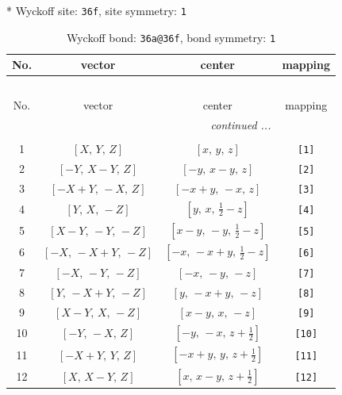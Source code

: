 \documentclass[fleqn,8pt]{jsarticle}
\begin{document}
* Wyckoff site: {\tt 36f}, site symmetry: {\tt 1}
\renewcommand{\arraystretch}{1.2}
\begin{longtable}{cccc}
\caption{Wyckoff bond: {\tt 36a@36f}, bond symmetry: {\tt 1}}
 \\
 \hline \hline
No. & vector & center & mapping \\ \hline \endfirsthead

\multicolumn{3}{l}{\tablename\ \thetable{}} \\
 \hline \hline
No. & vector & center & mapping \\ \hline \endhead

 \hline \hline
\multicolumn{3}{r}{\footnotesize\it continued ...} \\ \endfoot

 \hline \hline
\multicolumn{3}{r}{} \\ \endlastfoot

1 & $\left[ X,\, Y,\, Z \right]$ & $\left[ x,\, y,\, z \right]$ & {\tt [1]} \\ \hline
2 & $\left[ - Y,\, X - Y,\, Z \right]$ & $\left[ - y,\, x - y,\, z \right]$ & {\tt [2]} \\ \hline
3 & $\left[ - X + Y,\, - X,\, Z \right]$ & $\left[ - x + y,\, - x,\, z \right]$ & {\tt [3]} \\ \hline
4 & $\left[ Y,\, X,\, - Z \right]$ & $\left[ y,\, x,\, \frac{1}{2} - z \right]$ & {\tt [4]} \\ \hline
5 & $\left[ X - Y,\, - Y,\, - Z \right]$ & $\left[ x - y,\, - y,\, \frac{1}{2} - z \right]$ & {\tt [5]} \\ \hline
6 & $\left[ - X,\, - X + Y,\, - Z \right]$ & $\left[ - x,\, - x + y,\, \frac{1}{2} - z \right]$ & {\tt [6]} \\ \hline
7 & $\left[ - X,\, - Y,\, - Z \right]$ & $\left[ - x,\, - y,\, - z \right]$ & {\tt [7]} \\ \hline
8 & $\left[ Y,\, - X + Y,\, - Z \right]$ & $\left[ y,\, - x + y,\, - z \right]$ & {\tt [8]} \\ \hline
9 & $\left[ X - Y,\, X,\, - Z \right]$ & $\left[ x - y,\, x,\, - z \right]$ & {\tt [9]} \\ \hline
10 & $\left[ - Y,\, - X,\, Z \right]$ & $\left[ - y,\, - x,\, z + \frac{1}{2} \right]$ & {\tt [10]} \\ \hline
11 & $\left[ - X + Y,\, Y,\, Z \right]$ & $\left[ - x + y,\, y,\, z + \frac{1}{2} \right]$ & {\tt [11]} \\ \hline
12 & $\left[ X,\, X - Y,\, Z \right]$ & $\left[ x,\, x - y,\, z + \frac{1}{2} \right]$ & {\tt [12]} \\
\end{longtable}
\end{document}
